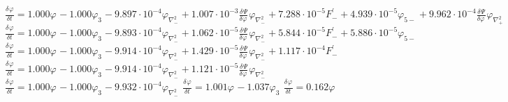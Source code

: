 $\frac{{\delta}^{} \varphi_{{}}}{{\delta} {t}^{}} = 1.000{{\varphi_{{}}}^{}} - 1.000{{\varphi_{3{}}}^{}} - 9.897\cdot 10^{-4}{{{\varphi}_{\scriptscriptstyle{\nabla^2_{-}}}}^{}} + 1.007\cdot 10^{-3}{{\frac{{\delta}^{} \Psi}{{\delta} {\varphi_{{}}}^{}}}^{}{{\varphi}_{\scriptscriptstyle{\nabla^2_{-}}}}^{}} + 7.288\cdot 10^{-5}{{{{F}^{\prime}_{-}}}^{}} + 4.939\cdot 10^{-5}{{{\varphi}_{5{-}}}^{}} + 9.962\cdot 10^{-4}{{\frac{{\delta}^{} \Psi}{{\delta} {\varphi_{{}}}^{}}}^{}{\varphi_{\scriptscriptstyle{\nabla^2_{+}}}}^{}}$
$\frac{{\delta}^{} \varphi_{{}}}{{\delta} {t}^{}} = 1.000{{\varphi_{{}}}^{}} - 1.000{{\varphi_{3{}}}^{}} - 9.893\cdot 10^{-4}{{{\varphi}_{\scriptscriptstyle{\nabla^2_{-}}}}^{}} + 1.062\cdot 10^{-5}{{\frac{{\delta}^{} \Psi}{{\delta} {\varphi_{{}}}^{}}}^{}{{\varphi}_{\scriptscriptstyle{\nabla^2_{-}}}}^{}} + 5.844\cdot 10^{-5}{{{{F}^{\prime}_{-}}}^{}} + 5.886\cdot 10^{-5}{{{\varphi}_{5{-}}}^{}}$
$\frac{{\delta}^{} \varphi_{{}}}{{\delta} {t}^{}} = 1.000{{\varphi_{{}}}^{}} - 1.000{{\varphi_{3{}}}^{}} - 9.914\cdot 10^{-4}{{{\varphi}_{\scriptscriptstyle{\nabla^2_{-}}}}^{}} + 1.429\cdot 10^{-5}{{\frac{{\delta}^{} \Psi}{{\delta} {\varphi_{{}}}^{}}}^{}{{\varphi}_{\scriptscriptstyle{\nabla^2_{-}}}}^{}} + 1.117\cdot 10^{-4}{{{{F}^{\prime}_{-}}}^{}}$
$\frac{{\delta}^{} \varphi_{{}}}{{\delta} {t}^{}} = 1.000{{\varphi_{{}}}^{}} - 1.000{{\varphi_{3{}}}^{}} - 9.914\cdot 10^{-4}{{{\varphi}_{\scriptscriptstyle{\nabla^2_{-}}}}^{}} + 1.121\cdot 10^{-5}{{\frac{{\delta}^{} \Psi}{{\delta} {\varphi_{{}}}^{}}}^{}{{\varphi}_{\scriptscriptstyle{\nabla^2_{-}}}}^{}}$
$\frac{{\delta}^{} \varphi_{{}}}{{\delta} {t}^{}} = 1.000{{\varphi_{{}}}^{}} - 1.000{{\varphi_{3{}}}^{}} - 9.932\cdot 10^{-4}{{{\varphi}_{\scriptscriptstyle{\nabla^2_{-}}}}^{}}$
$\frac{{\delta}^{} \varphi_{{}}}{{\delta} {t}^{}} = 1.001{{\varphi_{{}}}^{}} - 1.037{{\varphi_{3{}}}^{}}$
$\frac{{\delta}^{} \varphi_{{}}}{{\delta} {t}^{}} = 0.162{{\varphi_{{}}}^{}}$

